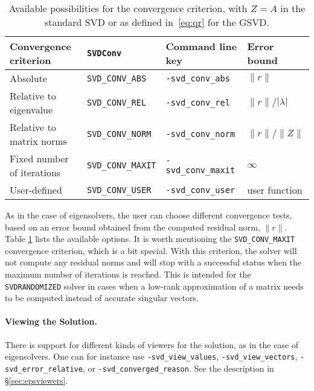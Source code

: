 \begin{table}
\centering
{\small \begin{tabular}{llll}
Convergence criterion      & \texttt{SVDConv}          & Command line key           & Error bound \\\hline
Absolute                   & \texttt{SVD\_CONV\_ABS}   & \texttt{-svd\_conv\_abs}   & $\|r\|$ \\
Relative to eigenvalue     & \texttt{SVD\_CONV\_REL}   & \texttt{-svd\_conv\_rel}   & $\|r\|/|\lambda|$ \\
Relative to matrix norms   & \texttt{SVD\_CONV\_NORM}  & \texttt{-svd\_conv\_norm}  & $\|r\|/\|Z\|$ \\
Fixed number of iterations & \texttt{SVD\_CONV\_MAXIT} & \texttt{-svd\_conv\_maxit} & $\infty$ \\
User-defined               & \texttt{SVD\_CONV\_USER}  & \texttt{-svd\_conv\_user}  & user function \\
\hline
\end{tabular} }
\caption{\label{tab:svdconvergence}Available possibilities for the convergence criterion, with $Z=A$ in the standard SVD or as defined in~\eqref{eq:qr} for the GSVD.}
\end{table}

As in the case of eigensolvers, the user can choose different convergence tests, based on an error bound obtained from the computed residual norm, $\|r\|$. Table \ref{tab:svdconvergence} lists the available options. It is worth mentioning the \texttt{SVD\_CONV\_MAXIT} convergence criterion, which is a bit special. With this criterion, the solver will not compute any residual norms and will stop with a successful status when the maximum number of iterations is reached. This is intended for the \texttt{SVDRANDOMIZED} solver in cases when a low-rank approximation of a matrix needs to be computed instead of accurate singular vectors.

\paragraph{Viewing the Solution.}

There is support for different kinds of viewers for the solution, as in the case of eigensolvers. One can for instance use \Verb!-svd_view_values!, \Verb!-svd_view_vectors!, \Verb!-svd_error_relative!, or \Verb!-svd_converged_reason!. See the description in \S\ref{sec:epsviewers}.

